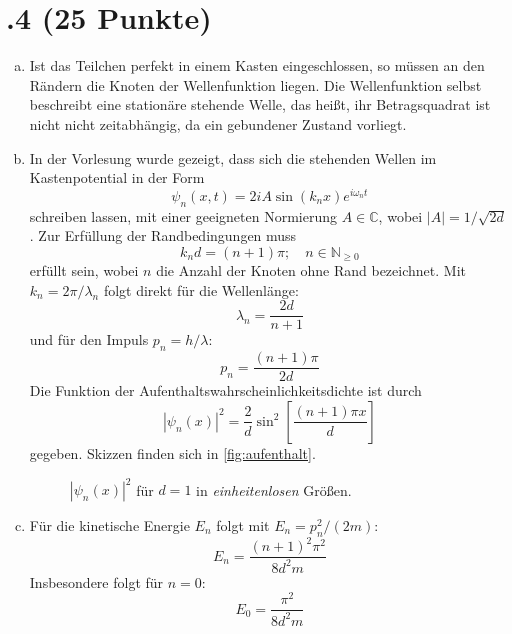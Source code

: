 \section*{\nr.4 \titfour (25 Punkte)}
\begin{enumerate}[(a)]
\item Ist das Teilchen perfekt in einem Kasten eingeschlossen, so müssen an den Rändern die Knoten der Wellenfunktion liegen. Die Wellenfunktion selbst beschreibt eine stationäre stehende Welle, das heißt, ihr Betragsquadrat ist nicht nicht zeitabhängig, da ein gebundener Zustand vorliegt.
\item In der Vorlesung wurde gezeigt, dass sich die stehenden Wellen im Kastenpotential in der Form
\begin{equation}
\psi_n(x,t) = 2i A \sin(k_n x) e^{i\omega_n t}
\end{equation}
schreiben lassen, mit einer geeigneten Normierung $A \in \mathbb{C}$, wobei $|A|=1/\sqrt{2d}$. Zur Erfüllung der Randbedingungen muss
\begin{equation}
k_n d = (n+1) \pi; \quad n\in \mathbb{N}_{\geq 0} 
\end{equation}
erfüllt sein, wobei $n$ die Anzahl der Knoten ohne Rand bezeichnet. Mit $k_n = 2\pi/\lambda_n$ folgt direkt für die Wellenlänge:
\begin{equation}
\lambda_n = \frac{2d}{n+1}
\end{equation}
und für den Impuls $p_n = h/\lambda$:
\begin{equation}
p_n = \frac{(n+1)\pi}{2d}
\end{equation}
Die Funktion der Aufenthaltswahrscheinlichkeitsdichte ist durch
\begin{equation}
|\psi_n(x)|^2 = \frac{2}{d} \sin^2\left[{\frac{(n+1)\pi x}{d}}\right]
\end{equation}
gegeben. Skizzen finden sich in \vref{fig:aufenthalt}.
\begin{figure}[htbp]
\centering

\caption{$|\psi_n(x)|^2$ für $d=1$ in \emph{einheitenlosen} Größen.}
\label{fig:aufenthalt}
\end{figure}

\item Für die kinetische Energie $E_n$ folgt mit $E_n=p_n^2/(2m)$:
\begin{equation}
E_n = \frac{(n+1)^2\pi^2}{8d^2m}
\end{equation}
Insbesondere folgt für $n=0$:
\begin{equation}
E_0 = \frac{\pi^2}{8d^2m}
\end{equation}


\end{enumerate}
